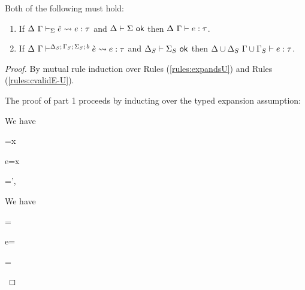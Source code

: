 \begin{theorem}\label{thm:typed-expansion-U} Both of the following must hold:
\begin{enumerate}
\item If $\Delta~\Gamma \vdash_{\Sigma} \hat{e} \leadsto e : \tau$ and $\Delta \vdash \Sigma~\mathsf{ok}$ then $\Delta~\Gamma \vdash e : \tau$.
\item If $\Delta~\Gamma\vdash^{\Delta_S;\,\Gamma_S;\,\Sigma_S;\,b} \grave{e} \leadsto e : \tau$ and $\Delta_S \vdash \Sigma_S~\mathsf{ok}$ then ${\Delta}\cup{\Delta_S}~{\Gamma}\cup{\Gamma_S} \vdash e : \tau$.
\end{enumerate}
\end{theorem}
\begin{proof}
By mutual rule induction over Rules (\ref{rules:expandsU}) and Rules (\ref{rules:cvalidE-U}). 

The proof of part 1 proceeds by inducting over the typed expansion assumption:
\begin{byCases}
\item[\text{(\ref{rule:expandsU-var})}] We have
\begin{pfsteps}
  \item \ue=x 
  \item e=x 
  \item \Gamma=\Gamma',  
  \item {} 
\end{pfsteps}
\resetpfcounter

\item[\text{(\ref{rule:expandsU-lam})}] We have 
\begin{pfsteps}
  \item \ue= 
  \item e= 
  \item \tau= 
  \item {}  
  \item {}  
  \item \uetsmenv{\Delta}{\Sigma}  
  \item {}  
  \item {} 
\end{pfsteps}
\resetpfcounter


\end{byCases}
\end{proof}
